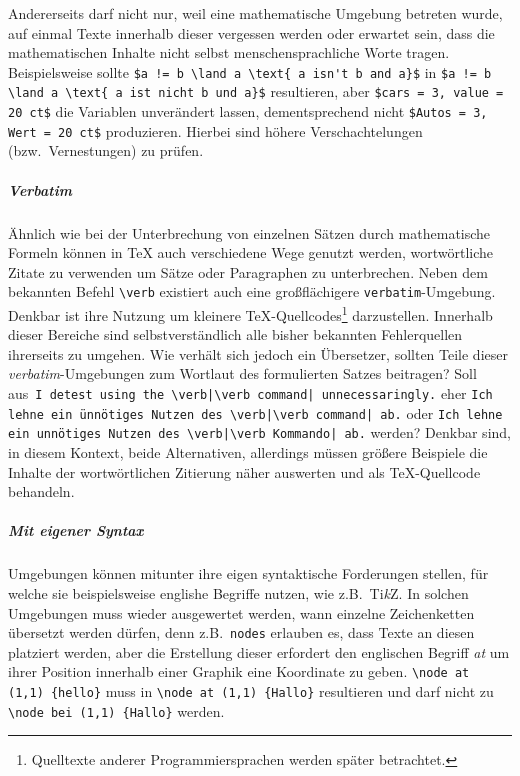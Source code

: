 Andererseits darf nicht nur, weil eine mathematische Umgebung betreten wurde, auf einmal Texte innerhalb dieser vergessen werden oder erwartet sein, dass die mathematischen Inhalte nicht selbst menschensprachliche Worte tragen. Beispielsweise sollte \verb|$a != b \land a \text{ a isn't b and a}$| in \verb|$a != b \land a \text{ a ist nicht b und a}$| resultieren, aber \verb|$cars = 3, value = 20 ct$| die Variablen unverändert lassen, dementsprechend nicht \verb|$Autos = 3, Wert = 20 ct$| produzieren.
Hierbei sind höhere Verschachtelungen (bzw.\ Vernestungen) zu prüfen. 

\subparagraph*{Verbatim}\par
Ähnlich wie bei der Unterbrechung von einzelnen Sätzen durch mathematische Formeln können in \TeX{} auch verschiedene Wege genutzt werden, wortwörtliche Zitate zu verwenden um Sätze oder Paragraphen zu unterbrechen. Neben dem bekannten Befehl \verb-\verb- existiert auch eine großflächigere \texttt{verbatim}-Umgebung. Denkbar ist ihre Nutzung um kleinere \TeX{}-Quellcodes\footnote{Quelltexte anderer Programmiersprachen werden später betrachtet.} darzustellen. Innerhalb dieser Bereiche sind selbstverständlich alle bisher bekannten Fehlerquellen ihrerseits zu umgehen. Wie verhält sich jedoch ein Übersetzer, sollten Teile dieser \textit{verbatim}-Umgebungen zum Wortlaut des formulierten Satzes beitragen? Soll aus\ \verb"I detest using the \verb|\verb command| unnecessaringly." eher \verb"Ich lehne ein ünnötiges Nutzen des \verb|\verb command| ab." oder \verb"Ich lehne ein unnötiges Nutzen des \verb|\verb Kommando| ab." werden? Denkbar sind, in diesem Kontext, beide Alternativen, allerdings müssen größere Beispiele die Inhalte der wortwörtlichen Zitierung näher auswerten und als \TeX{}-Quellcode behandeln.

\subparagraph*{Mit eigener Syntax}\par
Umgebungen können mitunter ihre eigen syntaktische Forderungen stellen, für welche sie beispielsweise englishe Begriffe nutzen, wie z.B.\ Ti\textit{k}Z. In solchen Umgebungen muss wieder ausgewertet werden, wann einzelne Zeichenketten übersetzt werden dürfen, denn z.B.\ \texttt{nodes} erlauben es, dass Texte an diesen platziert werden, aber die Erstellung dieser erfordert den englischen Begriff \textit{at} um ihrer Position innerhalb einer Graphik eine Koordinate zu geben.
\verb|\node at (1,1) {hello}| muss in \verb|\node at (1,1) {Hallo}| resultieren und darf nicht zu \verb|\node bei (1,1) {Hallo}| werden. 

